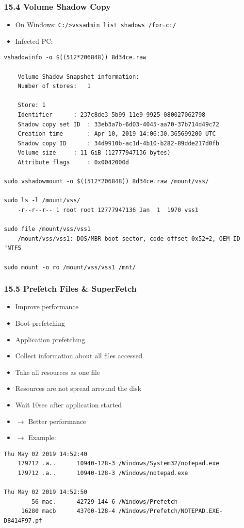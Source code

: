 \begin{frame}[fragile]
  \frametitle{15.4 Volume Shadow Copy}
    \begin{itemize}
	    \item On Windows: \texttt{C:/>vssadmin list shadows /for=c:/}
	    \item Infected PC:
  \end{itemize}
  \begin{lstlisting}[basicstyle=\tiny]
vshadowinfo -o $((512*206848)) 8d34ce.raw 

    Volume Shadow Snapshot information:
	Number of stores:	1

    Store: 1
	Identifier		: 237c8de3-5b99-11e9-9925-080027062798
	Shadow copy set ID	: 33eb3a7b-6d03-4045-aa70-37b714d49c72
	Creation time		: Apr 10, 2019 14:06:30.365699200 UTC
	Shadow copy ID		: 34d9910b-ac1d-4b10-b282-89dde217d0fb
	Volume size		: 11 GiB (12777947136 bytes)
	Attribute flags		: 0x0042000d

sudo vshadowmount -o $((512*206848)) 8d34ce.raw /mount/vss/

sudo ls -l /mount/vss/
	-r--r--r-- 1 root root 12777947136 Jan  1  1970 vss1

sudo file /mount/vss/vss1
	/mount/vss/vss1: DOS/MBR boot sector, code offset 0x52+2, OEM-ID "NTFS 

sudo mount -o ro /mount/vss/vss1 /mnt/
  \end{lstlisting}
\end{frame}


\begin{frame}[fragile]
  \frametitle{15.5 Prefetch Files \& SuperFetch}
    \begin{itemize}
        \item Improve performance
        \item Boot prefetching
	\item Application prefetching
	\item Collect information about all files accessed
	\item Take all resources as one file
	\item Resources are not spread arround the disk
	\item Wait 10sec after application started
	\item[] $\to$ Better performance
	\item[] $\to$ Example: 
    \end{itemize}
  \begin{lstlisting}[basicstyle=\tiny]
Thu May 02 2019 14:52:40
    179712 .a..      10940-128-3 /Windows/System32/notepad.exe
    179712 .a..      10940-128-3 /Windows/notepad.exe

Thu May 02 2019 14:52:50
        56 mac.      42729-144-6 /Windows/Prefetch
     16280 macb      43700-128-4 /Windows/Prefetch/NOTEPAD.EXE-D8414F97.pf
  \end{lstlisting}
\end{frame}


